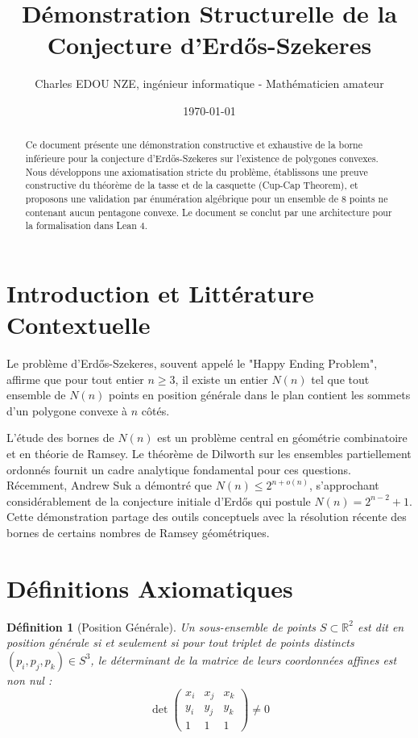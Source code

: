 \documentclass[11pt]{article}
\title{Démonstration Structurelle de la Conjecture d'Erd\H{o}s-Szekeres}
\author{Charles EDOU NZE, ingénieur informatique - Mathématicien amateur}
\date{\today}
\newtheorem{definition}{Définition}
\begin{document}
\maketitle

\begin{abstract}
Ce document présente une démonstration constructive et exhaustive de la borne inférieure pour la conjecture d'Erd\H{o}s-Szekeres sur l'existence de polygones convexes. Nous développons une axiomatisation stricte du problème, établissons une preuve constructive du théorème de la tasse et de la casquette (Cup-Cap Theorem), et proposons une validation par énumération algébrique pour un ensemble de 8 points ne contenant aucun pentagone convexe. Le document se conclut par une architecture pour la formalisation dans Lean 4.
\end{abstract}

\section{Introduction et Littérature Contextuelle}
Le problème d'Erd\H{o}s-Szekeres, souvent appelé le "Happy Ending Problem", affirme que pour tout entier $n \ge 3$, il existe un entier $N(n)$ tel que tout ensemble de $N(n)$ points en position générale dans le plan contient les sommets d'un polygone convexe à $n$ côtés.

L'étude des bornes de $N(n)$ est un problème central en géométrie combinatoire et en théorie de Ramsey. Le théorème de Dilworth sur les ensembles partiellement ordonnés fournit un cadre analytique fondamental pour ces questions. Récemment, Andrew Suk a démontré que $N(n) \le 2^{n + o(n)}$, s'approchant considérablement de la conjecture initiale d'Erd\H{o}s qui postule $N(n) = 2^{n-2} + 1$. Cette démonstration partage des outils conceptuels avec la résolution récente des bornes de certains nombres de Ramsey géométriques.

\section{Définitions Axiomatiques}
\begin{definition}[Position Générale]
Un sous-ensemble de points $S \subset \mathbb{R}^2$ est dit en position générale si et seulement si pour tout triplet de points distincts $(p_i, p_j, p_k) \in S^3$, le déterminant de la matrice de leurs coordonnées affines est non nul :
\[
\det \begin{pmatrix} x_i & x_j & x_k \\ y_i & y_j & y_k \\ 1 & 1 & 1 \end{pmatrix} \neq 0
\]
\end{definition}
\end{document}
